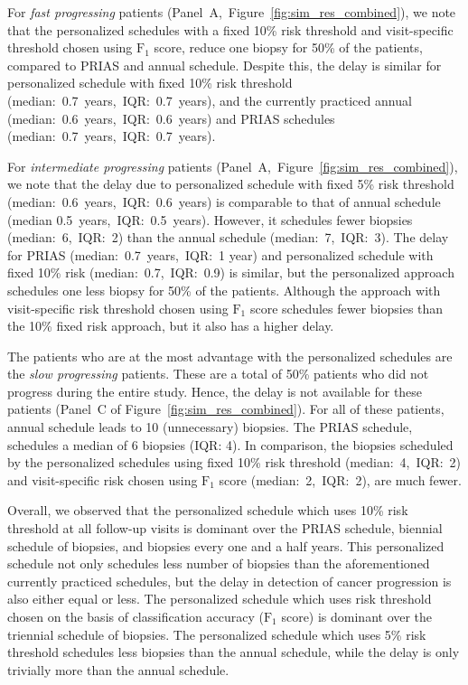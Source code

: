  For \textit{fast progressing} patients (Panel~A,~Figure~\ref{fig:sim_res_combined}), we note that the personalized schedules with a fixed 10\% risk threshold and visit-specific threshold chosen using $\mbox{F}_1$ score, reduce one biopsy for 50\% of the patients, compared to PRIAS and annual schedule. Despite this, the delay is similar for personalized schedule with fixed 10\% risk threshold (median:~0.7~years,~IQR:~0.7~years), and the currently practiced annual (median:~0.6~years,~IQR:~0.6~years) and PRIAS schedules (median:~0.7~years,~IQR:~0.7~years).

For \textit{intermediate progressing} patients (Panel~A,~Figure~\ref{fig:sim_res_combined}), we note that the delay due to personalized schedule with fixed 5\% risk threshold (median:~0.6~years,~IQR:~0.6~years) is comparable to that of annual schedule (median 0.5~years,~IQR:~0.5~years). However, it schedules fewer biopsies (median:~6,~IQR:~2) than the annual schedule (median:~7,~IQR:~3). The delay for PRIAS (median:~0.7~years,~IQR:~1 year) and personalized schedule with fixed 10\% risk (median:~0.7,~IQR:~0.9) is similar, but the personalized approach schedules one less biopsy for 50\% of the patients. Although the approach with visit-specific risk threshold chosen using $\mbox{F}_1$ score schedules fewer biopsies than the 10\% fixed risk approach, but it also has a higher delay.

The patients who are at the most advantage with the personalized schedules are the \textit{slow progressing} patients. These are a total of 50\% patients who did not progress during the entire study. Hence, the delay is not available for these patients (Panel~C of Figure~\ref{fig:sim_res_combined}). For all of these patients, annual schedule leads to 10 (unnecessary) biopsies. The PRIAS schedule, schedules a median of 6 biopsies (IQR: 4). In comparison, the biopsies scheduled by the personalized schedules using fixed 10\% risk threshold (median:~4,~IQR:~2) and visit-specific risk chosen using $\mbox{F}_1$ score (median:~2,~IQR:~2), are much fewer.

Overall, we observed that the personalized schedule which uses 10\% risk threshold at all follow-up visits is dominant over the PRIAS schedule, biennial schedule of biopsies, and biopsies every one and a half years. This personalized schedule not only schedules less number of biopsies than the aforementioned currently practiced schedules, but the delay in detection of cancer progression is also either equal or less. The personalized schedule which uses risk threshold chosen on the basis of classification accuracy ($\mbox{F}_1$ score) is dominant over the triennial schedule of biopsies. The personalized schedule which uses 5\% risk threshold schedules less biopsies than the annual schedule, while the delay is only trivially more than the annual schedule.

